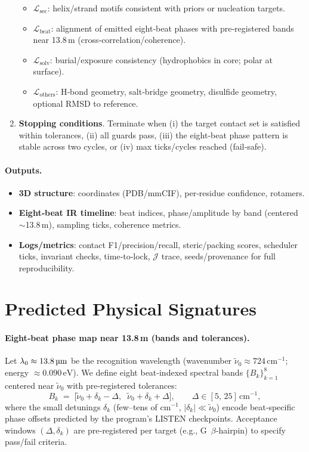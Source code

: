\documentclass[12pt,a4paper]{article}
\begin{document}
\begin{enumerate}
\begin{itemize}
    \item $\mathcal{L}_{\mathrm{sec}}$: helix/strand motifs consistent with priors or nucleation targets.
    \item $\mathcal{L}_{\mathrm{beat}}$: alignment of emitted eight‑beat phases with pre‑registered bands near 13.8\,\textmu m (cross‑correlation/coherence).
    \item $\mathcal{L}_{\mathrm{solv}}$: burial/exposure consistency (hydrophobics in core; polar at surface).
    \item $\mathcal{L}_{\mathrm{others}}$: H‑bond geometry, salt‑bridge geometry, disulfide geometry, optional RMSD to reference.
  \end{itemize}
  \item \textbf{Stopping conditions}. Terminate when (i) the target contact set is satisfied within tolerances, (ii) all guards pass, (iii) the eight‑beat phase pattern is stable across two cycles, or (iv) max ticks/cycles reached (fail‑safe).
\end{enumerate}

\paragraph{Outputs.}
\begin{itemize}
  \item \textbf{3D structure}: coordinates (PDB/mmCIF), per‑residue confidence, rotamers.
  \item \textbf{Eight‑beat IR timeline}: beat indices, phase/amplitude by band (centered $\sim$13.8\,\textmu m), sampling ticks, coherence metrics.
  \item \textbf{Logs/metrics}: contact F1/precision/recall, steric/packing scores, scheduler ticks, invariant checks, time‑to‑lock, $\mathcal{J}$ trace, seeds/provenance for full reproducibility.
\end{itemize}

\section{Predicted Physical Signatures}

\paragraph{Eight‑beat phase map near 13.8\,\textmu m (bands and tolerances).}
Let $\lambda_0 \approx 13.8\,\text{\textmu m}$ be the recognition wavelength (wavenumber $\tilde\nu_0 \approx 724\,\text{cm}^{-1}$; energy $\approx 0.090\,\text{eV}$). We define eight beat‑indexed spectral bands $\{B_k\}_{k=1}^{8}$ centered near $\tilde\nu_0$ with pre‑registered tolerances:
\[
B_k \;=\; \bigl[\tilde\nu_0 + \delta_k - \Delta,\;\; \tilde\nu_0 + \delta_k + \Delta\bigr],\qquad
\Delta \in [5,\,25]\,\text{cm}^{-1},
\]
where the small detunings $\delta_k$ (few–tens of $\text{cm}^{-1}$, $|\delta_k|\ll \tilde\nu_0$) encode beat‑specific phase offsets predicted by the program's LISTEN checkpoints. Acceptance windows $(\Delta,\delta_k)$ are pre‑registered per target (e.g., G~$\beta$‑hairpin) to specify pass/fail criteria.
\end{document}
